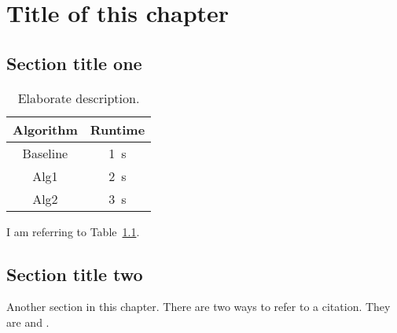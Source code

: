 \chapter{Title of this chapter}
\label{chp:2}

\section{Section title one}
\label{sec:2.1}

\begin{table}[tbh]
\renewcommand{\arraystretch}{1.3}
\centering
\begin{tabular}{c|c}
Algorithm & Runtime\\
\hline
Baseline & 1~s\\
\hline
Alg1 & 2~s\\
\hline
Alg2 & 3~s\\
\end{tabular}
\caption[Simple description for list of tables]
  {Elaborate description.}
\label{tab:table1}
\end{table}

I am referring to Table~\ref{tab:table1}.

\section{Section title two}
\label{sec:2.2}

Another section in this chapter. There are two ways to refer to a citation.
They are \citep{greenwade93} and \citet{greenwade93}.